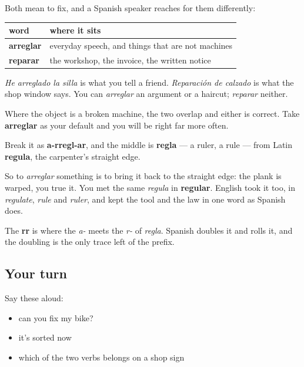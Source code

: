 \begin{grammarlens}[title={Grammar Lens: arreglar and reparar}]
Both mean to fix, and a Spanish speaker reaches for them differently:

\noindent
\begin{tabularx}{\linewidth}{@{}>{\raggedright\arraybackslash}X>{\raggedright\arraybackslash}X@{}}
\toprule
\textbf{word} & \textbf{where it sits} \\
\midrule
\textbf{arreglar} & everyday speech, and things that are not machines \\
\textbf{reparar} & the workshop, the invoice, the written notice \\
\bottomrule
\end{tabularx}

\emph{He arreglado la silla} is what you tell a friend. \emph{Reparación de calzado} is what the shop window says. You can \emph{arreglar} an argument or a haircut; \emph{reparar} neither.

Where the object is a broken machine, the two overlap and either is correct. Take \textbf{arreglar} as your default and you will be right far more often.
\end{grammarlens}

\begin{cousinweb}
Break it as \textbf{a-rregl-ar}, and the middle is \textbf{regla} — a ruler, a rule — from Latin \textbf{regula}, the carpenter's straight edge.

So to \emph{arreglar} something is to bring it back to the straight edge: the plank is warped, you true it. You met the same \emph{regula} in \textbf{regular}. English took it too, in \emph{regulate}, \emph{rule} and \emph{ruler}, and kept the tool and the law in one word as Spanish does.

The \textbf{rr} is where the \emph{a-} meets the \emph{r-} of \emph{regla}. Spanish doubles it and rolls it, and the doubling is the only trace left of the prefix.
\end{cousinweb}

\subsection*{Your turn}
Say these aloud:

\begin{itemize}
\raggedright
  \item can you fix my bike?
  \item it's sorted now
  \item which of the two verbs belongs on a shop sign
\end{itemize}

